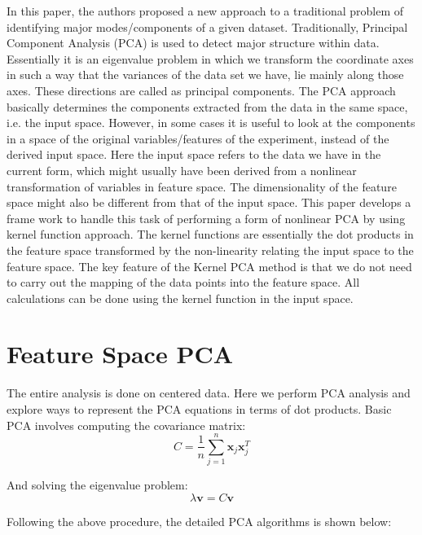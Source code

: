 In this paper, the authors proposed a new approach to a traditional problem of identifying major modes/components of a given dataset. Traditionally, Principal Component Analysis (PCA) is used to detect major structure within data. Essentially it is an eigenvalue problem in which we transform the coordinate axes in such a way that the variances of the data set we have, lie mainly along those axes. These directions are called as principal components. The PCA approach basically determines the components extracted from the data in the same space, i.e. the input space. However, in some cases it is useful to look at the components in a space of the original variables/features of the experiment, instead of the derived input space. Here the input space refers to the data we have in the current form, which might usually have been derived from a nonlinear transformation of variables in feature space. The dimensionality of the feature space might also be different from that of the input space. This paper develops a frame work to handle this task of performing a form of nonlinear PCA by using kernel function approach. The kernel functions are essentially the dot products in the feature space transformed by the non-linearity relating the input space to the feature space. The key feature of the Kernel PCA method is that we do not need to carry out the mapping of the data points into the feature space. All calculations can be done using the kernel function in the input space. \\

\section{Feature Space PCA}

The entire analysis is done on centered data. Here we perform PCA analysis and explore ways to represent the PCA equations in terms of dot products. Basic PCA involves computing the covariance matrix:
\begin{equation}
C = \frac{1}{n} \sum_{j=1}^n \pmb{x}_j \pmb{x}_j^T
\end{equation}

And solving the eigenvalue problem:
\begin{equation}
\lambda \pmb{v} = C \pmb{v}
\end{equation}

Following the above procedure, the detailed PCA algorithms is shown below:\\


